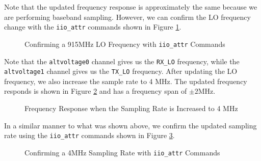 \documentclass{article}
\begin{document}
Note that the updated frequency response is approximately the same because we are performing baseband sampling. However, we can confirm the LO frequency change with the \texttt{iio\_attr} commands shown in Figure \ref{fig::iio_attr_confirm_lo_frequency}.

\begin{figure}[H]
	\centerline{}
	\caption{Confirming a 915MHz LO Frequency with \texttt{iio\_attr} Commands}
	\label{fig::iio_attr_confirm_lo_frequency}
\end{figure}

Note that the \texttt{altvoltage0} channel gives us the \texttt{RX\_LO} frequency, while the \texttt{altvoltage1} channel gives us the \texttt{TX\_LO} frequency. After updating the LO frequency, we also increase the sample rate to 4 MHz. The updated frequency responds is shown in Figure \ref{fig::gnu_radio_loopback_generic_iio_4MSPS} and has a frequency span of $\pm 2 \text{MHz}$.

\begin{figure}[H]
	\centerline{}
	\caption{Frequency Response when the Sampling Rate is Increased to 4 MHz}
	\label{fig::gnu_radio_loopback_generic_iio_4MSPS}
\end{figure}

In a similar manner to what was shown above, we confirm the updated sampling rate using the \texttt{iio\_attr} commands shown in Figure \ref{fig::iio_attr_confirm_sampling_rate}.

\begin{figure}[H]
	\centerline{}
	\caption{Confirming a 4MHz Sampling Rate with \texttt{iio\_attr} Commands}
	\label{fig::iio_attr_confirm_sampling_rate}
\end{figure}
\end{document}
